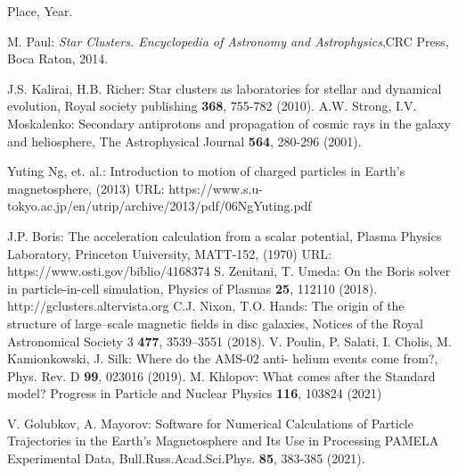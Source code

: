 \documentclass{article}
\begin{document}
\begin{thebibliography}{99}
Place, Year.




 M. Paul: {\em Star Clusters. Encyclopedia of Astronomy and Astrophysics},CRC Press, Boca Raton, 2014.




 J.S. Kalirai, H.B. Richer: Star clusters as laboratories for stellar and dynamical evolution, Royal society publishing {\bf 368}, 755-782 (2010).
 A.W. Strong, I.V. Moskalenko: Secondary antiprotons and propagation of cosmic rays in the galaxy and heliosphere, The Astrophysical Journal {\bf 564}, 280-296 (2001).


 Yuting Ng, et. al.: Introduction to motion of charged particles in Earth's magnetosphere, (2013) URL: https://www.s.u-tokyo.ac.jp/en/utrip/archive/2013/pdf/06NgYuting.pdf

 J.P. Boris: The acceleration calculation from a scalar potential, Plasma Physics Laboratory, Princeton University, MATT-152, (1970) URL: https://www.osti.gov/biblio/4168374
 S. Zenitani, T. Umeda: On the Boris solver in particle-in-cell simulation, Physics of Plasmas { \bf 25}, 112110 (2018).
 http://gclusters.altervista.org 
 C.J. Nixon, T.O. Hands: The origin of the structure of large–scale magnetic fields in disc galaxies, Notices of the Royal Astronomical Society 3 { \bf 477}, 3539–3551 (2018).
 V. Poulin, P. Salati, I. Cholis, M. Kamionkowski, J. Silk: Where do the AMS-02 anti- helium events come from?,  Phys. Rev. D {\bf 99}, 023016 (2019).
 M. Khlopov: What comes after the Standard model?  Progress in Particle and Nuclear Physics {\bf 116}, 103824 (2021)

 V. Golubkov, A. Mayorov: Software for Numerical Calculations of Particle Trajectories in the Earth’s Magnetosphere and Its Use in Processing PAMELA Experimental Data, Bull.Russ.Acad.Sci.Phys. {\bf 85}, 383-385 (2021).
\end{thebibliography}
\end{document}
